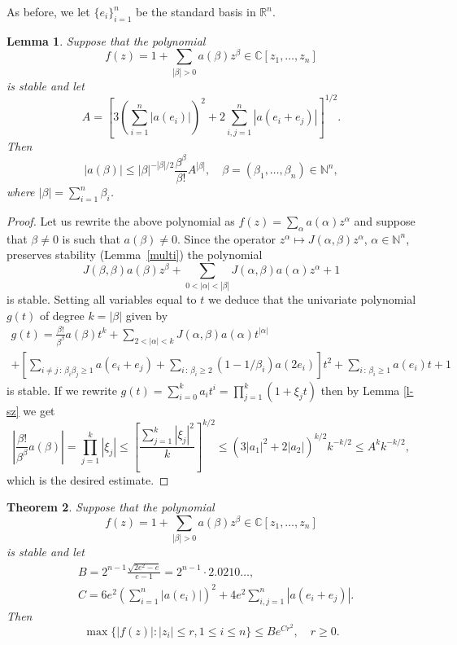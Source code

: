 \documentclass[10pt,reqno]{amsart}
\theoremstyle{plain}
\newtheorem{theorem}{Theorem}[section]
\newtheorem{lemma}[theorem]{Lemma}
\theoremstyle{definition}
\theoremstyle{remark}
\numberwithin{equation}{section}
\newcommand{\NN}{\mathbb{N}}
\newcommand{\RR}{\mathbb{R}}
\newcommand{\CC}{\mathbb{C}}
\begin{document}
{As before, we let $\{e_i\}_{i=1}^{n}$ be the standard basis in $\RR^n$.

\begin{lemma}\label{edreibound}
Suppose that the polynomial 
$$
f(z)=1+ \sum_{|\beta|>0}a(\beta)z^\beta 
\in\CC[z_1,\ldots, z_n] 
$$
is stable and let
$$
A=\left[3\left(\sum_{i=1}^n |a(e_i)|\right)^2
+2\sum_{i,j=1}^n |a(e_i+e_j)|\right]^{1/2}.
$$
Then 
$$
|a(\beta)| \leq |\beta|^{-|\beta|/2} \frac{\beta^\beta}{\beta!} A^{|\beta|},
\quad \beta=(\beta_1,\ldots,\beta_n) \in\NN^n,
$$
where $|\beta|=\sum_{i=1}^{n}\beta_i$.
\end{lemma}

\begin{proof}
Let us rewrite the above polynomial as $f(z)=\sum_{\alpha}a(\alpha)z^\alpha$ 
and suppose that $\beta\neq 0$ is such that $a(\beta) \neq 0$. Since the 
operator $z^\alpha \mapsto J(\alpha, \beta)z^\alpha$, $\alpha\in\NN^n$, 
preserves stability (Lemma~\ref{multi}) the polynomial 
$$
J(\beta,\beta)a(\beta)z^\beta 
+ \sum_{0<|\alpha|<|\beta|} J(\alpha, \beta)a(\alpha)z^\alpha+1
$$
is stable. Setting all variables equal to $t$ we deduce that the univariate 
polynomial $g(t)$ of degree $k=|\beta|$ given by 
\begin{multline*}
g(t)=\frac{\beta!}{\beta^\beta}a(\beta)t^{k} 
+ \sum_{2<|\alpha|<k}J(\alpha,\beta)a(\alpha)t^{|\alpha|}\\
+\left[\sum_{i\neq j\,:\,\beta_i\beta_j \ge 1} a(e_i+e_j)
+ \sum_{i\,:\,\beta_i \geq 2} (1-1/\beta_i)a(2e_i)\right]t^2
+\sum_{i\,:\,\beta_i\geq 1} a(e_i)t +1 
\end{multline*}
is stable. If we rewrite $g(t)=\sum_{i=0}^{k}a_it^i=\prod_{j=1}^k (1+\xi_jt)$ 
then by Lemma \ref{l-sz} we get
$$
\left|\frac {\beta!}{\beta^\beta}a(\beta)\right|=\prod_{j=1}^{k}|\xi_j|
\le \left[\frac{\sum_{j=1}^{k} |\xi_j|^2}{k}\right]^{k/2}
\leq \left(3|a_1|^2+2|a_2|\right)^{k/2}  k^{-k/2} \leq A^k k^{-k/2},
$$
which is the desired estimate.
\end{proof}}

\begin{theorem}\label{multi-szasz}
Suppose that the polynomial 
$$
f(z)=1+ \sum_{|\beta|>0}a(\beta)z^\beta \in \CC[z_1,\ldots, z_n] 
$$
is stable and let
\begin{equation*}
\begin{split}
&B=2^{n-1} \frac {\sqrt{2e^2-e}} {e-1} = 2^{n-1} \cdot2.0210\ldots , \\
&C=6e^2\left(\sum_{i=1}^n |a(e_i)|\right)^2+4e^2\sum_{i,j=1}^n |a(e_i+e_j)|.
\end{split}
\end{equation*}
Then 
$$
\max \Big\{ |f(z)| : |z_i| \leq r, 1\leq i \leq n\Big\} \leq B
\displaystyle{e^{Cr^2}},\quad r\ge 0.
$$
\end{theorem}
\end{document}
